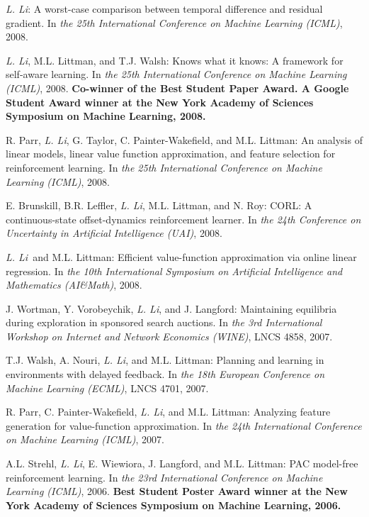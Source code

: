 \documentclass[10pt,twoside,letterpaper]{article}
\newcommand{\selffont}[1]{{\textit{#1}}}
\newcommand{\venuefont}[1]{{\textit{#1}}}
\newcommand{\myself}{\selffont{L. Li}}
\begin{document}
\begin{compactenum}[(C1)]
\item{\myself: A worst-case comparison between temporal
difference and residual gradient.  In \venuefont{the 25th
International Conference on Machine Learning (ICML)}, 2008.}

\item{\myself, M.L. Littman, and T.J. Walsh: Knows what it
knows: A framework for self-aware learning. In \venuefont{the
25th International Conference on Machine Learning (ICML)},
2008.  \textbf{Co-winner of the Best Student Paper Award.
A Google Student Award winner at the New York Academy of Sciences
Symposium on Machine Learning, 2008.}}

\item{R. Parr, \myself, G. Taylor, C. Painter-Wakefield, and
M.L. Littman: An analysis of linear models, linear value function
approximation, and feature selection for reinforcement learning.
In \venuefont{the 25th International Conference on Machine
Learning (ICML)}, 2008.}

\item{E. Brunskill, B.R. Leffler, \myself, M.L. Littman, and N.
Roy: CORL: A continuous-state offset-dynamics reinforcement
learner.  In \venuefont{the 24th Conference on Uncertainty in
Artificial Intelligence (UAI)}, 2008.}

\item{\myself\ and M.L. Littman: Efficient value-function
approximation via online linear regression.  In \venuefont{the 10th
International Symposium on Artificial Intelligence and Mathematics
(AI\&Math)}, 2008.}

\item{J. Wortman, Y. Vorobeychik, \myself, and J. Langford:
Maintaining equilibria during exploration in sponsored search
auctions.  In \venuefont{the 3rd International Workshop on Internet
and Network Economics (WINE)}, LNCS 4858, 2007.}

\item{T.J. Walsh, A. Nouri, \myself, and M.L. Littman:
Planning and learning in environments with delayed feedback.  In
\venuefont{the 18th European Conference on Machine Learning
(ECML)}, LNCS 4701, 2007.}

\item{R. Parr, C. Painter-Wakefield, \myself, and M.L.
Littman: Analyzing feature generation for value-function
approximation.  In \venuefont{the 24th International
Conference on Machine Learning (ICML)}, 2007.}

\item{A.L. Strehl, \myself, E. Wiewiora, J. Langford, and M.L. Littman: PAC model-free reinforcement learning.  In \venuefont{the 23rd International Conference on Machine Learning (ICML)}, 2006.  \textbf{Best Student Poster Award winner at the New York Academy of Sciences Symposium on Machine Learning, 2006.}}


\end{compactenum}
\end{document}
